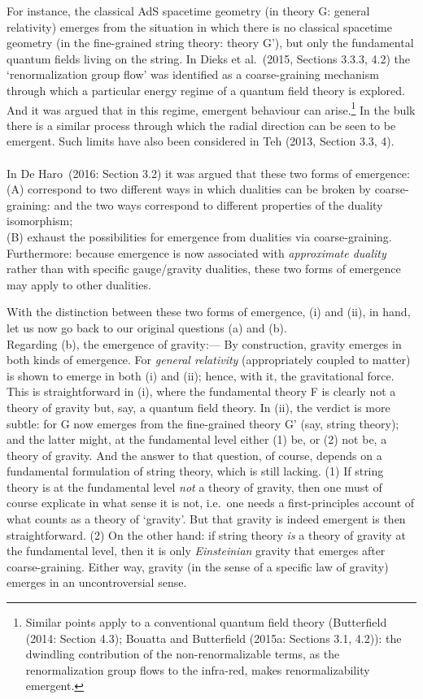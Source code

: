 \documentclass[12pt]{article}
\renewcommand{\^}[1]{\hat{#1}}
\begin{document}
For instance, the classical AdS spacetime geometry (in theory G: general relativity) emerges from the situation in which there is no classical spacetime geometry (in the fine-grained string theory: theory G'), but only the fundamental quantum fields living on the string. In Dieks et al.~(2015, Sections 3.3.3, 4.2) the `renormalization group flow' was identified as a coarse-graining mechanism through which a particular energy regime of a quantum field theory is explored. And it was argued that in this regime, emergent behaviour can arise.\footnote{Similar points apply to a conventional quantum field theory (Butterfield (2014: Section 4.3); Bouatta and Butterfield (2015a: Sections 3.1, 4.2)): the dwindling contribution of the non-renormalizable terms, as the renormalization group flows to the infra-red, makes renormalizability emergent.} In the bulk there is a similar process through which the radial direction can be seen to be emergent.  Such limits have also been considered in Teh (2013, Section 3.3, 4).\\
\\
In De Haro~(2016: Section 3.2) it was argued that these two forms of emergence:\\
\indent (A) correspond to two different ways in which dualities can be broken by coarse-graining: and the two ways correspond to different properties of the duality isomorphism; \\
\indent (B) exhaust the possibilities for emergence from dualities via coarse-graining.\\
Furthermore: because emergence is now associated with {\it approximate duality} rather than with specific gauge/gravity dualities, these two forms of emergence may apply to other dualities. 

With the distinction between these two forms of emergence, (i) and (ii), in hand, let us now go back to our original questions (a) and (b).\\

 Regarding (b), the emergence of gravity:--- By construction, gravity emerges in both kinds of emergence. For {\it general relativity} (appropriately coupled to matter) is shown to emerge in both (i) and (ii); hence, with it, the gravitational force. This is straightforward in (i), where the fundamental theory F is clearly not a theory of gravity but, say, a quantum field theory. In (ii), the verdict is more subtle: for G now emerges from the fine-grained theory G' (say, string theory); and the latter might, at the fundamental level either (1) be, or (2) not be, a theory of gravity. And the answer to that question, of course, depends on a fundamental formulation of string theory, which is still lacking. (1) If string theory is at the fundamental level {\em not} a theory of gravity, then one must of course explicate in what sense it is not, i.e.~one needs a first-principles account of what counts as a theory of `gravity'. But that gravity is indeed emergent is then straightforward. (2) On the other hand: if string theory {\it is} a theory of gravity at the fundamental level, then it is only {\it Einsteinian}  gravity that emerges after coarse-graining. Either way, gravity (in the sense of a specific law of gravity) emerges in an uncontroversial sense.
\end{document}
